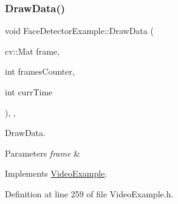 \subsubsection{\texorpdfstring{Draw\+Data()}{DrawData()}}
{\footnotesize\ttfamily void Face\+Detector\+Example\+::\+Draw\+Data (\begin{DoxyParamCaption}\item[{cv\+::\+Mat}]{frame,  }\item[{int}]{frames\+Counter,  }\item[{int}]{curr\+Time }\end{DoxyParamCaption})\hspace{0.3cm}{\ttfamily [inline]}, {\ttfamily [protected]}, {\ttfamily [virtual]}}



Draw\+Data. 


\begin{DoxyParams}{Parameters}
{\em frame} & \\
\hline
\end{DoxyParams}


Implements \mbox{\hyperlink{class_video_example_a53eb15977cb147dac218d8ea337986cd}{Video\+Example}}.



Definition at line 259 of file Video\+Example.\+h.



